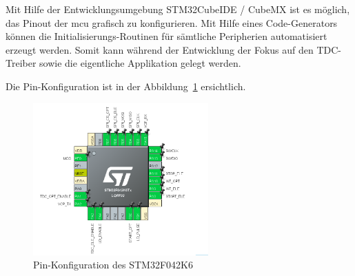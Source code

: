 Mit Hilfe der Entwicklungsumgebung STM32CubeIDE / CubeMX \cite{st2025stm32cubeide} ist es möglich, das Pinout der
\acrshort{mcu} grafisch zu konfigurieren. Mit Hilfe eines Code-Generators können die Initialisierungs-Routinen für
sämtliche Peripherien automatisiert erzeugt werden. Somit kann während der Entwicklung der Fokus auf den TDC-Treiber
sowie die eigentliche Applikation gelegt werden.

Die Pin-Konfiguration ist in der Abbildung~\ref{fig:pinconfiguration_mcu} ersichtlich.

\begin{figure}[H]
    \centering
    \includegraphics[width=0.6\textwidth]{graphics/pinconfiguration_mcu.png}
    \caption{Pin-Konfiguration des STM32F042K6}\label{fig:pinconfiguration_mcu}
\end{figure}

\pagebreak
